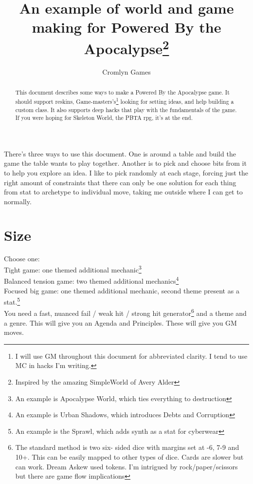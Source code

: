 \documentclass{tufte-handout}
\title{An example of world and game making for Powered By the Apocalypse\thanks{Inspired by the amazing SimpleWorld of Avery Alder}}
\author[Cromlyn Games]{Cromlyn Games}
\begin{document}
\maketitle%

\begin{abstract}
\noindent
This document describes some ways to make  a Powered By the Apocalypse game.
It should support reskins, Game-masters's\footnote{I will use GM throughout this document for abbreviated clarity. I tend to use MC in hacks I'm writing.} looking for setting ideas, and help building a custom class.
It also supports deep hacks that play with the fundamentals of the game.
If you were hoping for Skeleton World, the PBTA rpg, it's at the end.
\end{abstract}

There's three ways to use this document. One is around a table and build the game the table wants to play together. Another is to pick and choose bits from it to help you explore an idea. I like to pick randomly at each stage, forcing just the right amount of constraints that there can only be one solution for each thing from stat to archetype to individual move, taking me outside where I can get to normally.

\section{Size}
Choose one:\\
Tight game: one themed additional mechanic\footnote{An example is Apocalypse World, which ties everything to destruction} \\
Balanced tension game: two themed additional mechanics\footnote{An example is Urban Shadows, which introduces Debts and Corruption}\\
Focused big game: one themed additional mechanic, second theme present as a stat.\footnote{An example is the Sprawl, which adds synth as a stat for cyberwear}\\


You need a fast, nuanced fail / weak hit / strong hit generator\footnote{The standard method is two six- sided dice with margins set at -6, 7-9 and 10+. This can be easily mapped to other types of dice. Cards are slower but can work. Dream Askew used tokens. I'm intrigued by rock/paper/scissors but there are game flow implications}
 and a theme and a genre. This will give you an Agenda and Principles. These will give you GM moves. 
\end{document}
